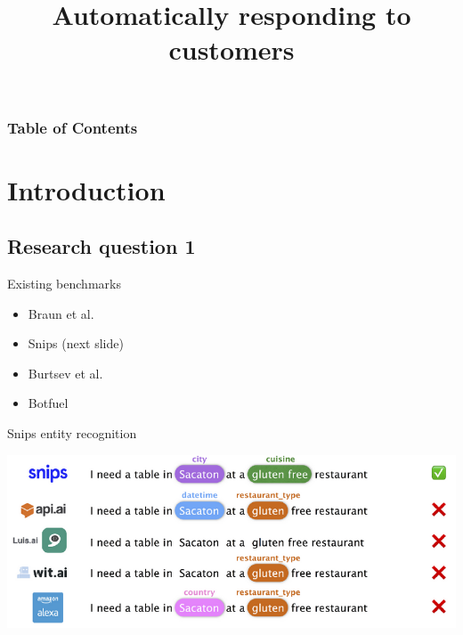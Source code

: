 \documentclass[pdf]{beamer}
\title{Automatically responding to customers}
\begin{document}
    \begin{frame}
        \titlepage
    \end{frame}

    \begin{frame}
        \frametitle{Table of Contents}
        \tableofcontents[hideothersubsections]
    \end{frame}

    \section{Introduction}
    \subsection{Research question 1}
    \begin{frame}{Existing benchmarks}
        \begin{itemize}
            \item Braun et al.
            \item Snips (next slide)
            \item Burtsev et al.
            \item Botfuel
        \end{itemize}
    \end{frame}

    \begin{frame}{Snips entity recognition}
        \begin{center}
            \includegraphics[width=\textwidth]{figures/snips_ner.png}
        \end{center}
    \end{frame}
\end{document}
